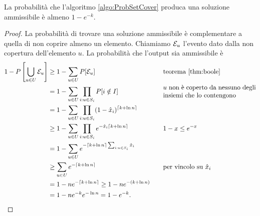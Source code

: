 \begin{theorem}\label{thm:ammisetcover}
	La probabilità che l'algoritmo \ref{algo:ProbSetCover} produca una soluzione ammissibile è almeno $1-e^{-k}$.
\end{theorem}
\begin{proof}
	La probabilità di trovare una soluzione ammissibile è complementare a quella di non coprire almeno un elemento.
	Chiamiamo $\mathcal E_u$ l'evento dato dalla non copertura dell'elemento $u$.
	La probabilità che l'output sia ammissibile è
	\begin{align*}
		1-P\left[\bigcup_{u\in U} \eve_u\right] & \geq 1-\sum_{u\in U} P[\eve_u]                                     &  & \quad \text{teorema \ref{thm:boole}}                                             \\
		                                        & = 1-\sum_{u\in U}\prod_{i:u\in S_i} P[i\notin I]                   &  & \quad \parbox{5cm}{$u$ non è coperto da nessuno degli insiemi che lo contengono} \\
		                                        & = 1-\sum_{u\in U}\prod_{i:u\in S_i} (1-\hat x_i)^{\ceil{k+\ln n}}                                                                                        \\
		                                        & \geq 1-\sum_{u\in U}\prod_{i:u\in S_i} e^{-\hat x_i\ceil{k+\ln n}} &  & \quad \text{$1-x\leq e^{-x}$}                                                    \\
		                                        & = 1-\sum_{u\in U} e^{-\ceil{k+\ln n}\sum_{i:u\in S_i} \hat x_i}                                                                                          \\
		                                        & \geq \sum_{u\in U} e^{-\ceil{k+\ln n}}                             &  & \quad \text{per vincolo su $\hat x_i$}                                           \\
		                                        & = 1-ne^{-\ceil{k+\ln n}} \geq 1-ne^{-(k+\ln n)}                                                                                                          \\
		                                        & = 1-ne^{-k}e^{-\ln n} = 1-e^{-k} \text.
	\end{align*}
\end{proof}

